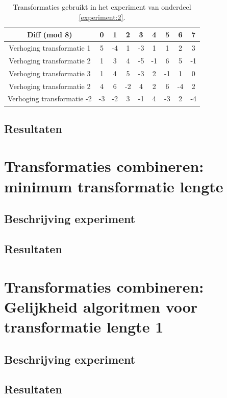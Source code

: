\begin{table}
  \centering
  \begin{tabular}{c | c c c c c c c c }
    Diff (mod 8) & 0 & 1 & 2 & 3 & 4 & 5 & 6 & 7 \\
    \hline
    \hline
    Verhoging transformatie 1 & 5 & -4 & 1 & -3 & 1 & 1 & 2 & 3 \\
    \hline
    Verhoging transformatie 2 & 1 & 3 & 4 & -5 & -1 & 6 & 5 & -1 \\
    \hline
    Verhoging transformatie 3 & 1 & 4 & 5 & -3 & 2 & -1 & 1 & 0 \\
    \hline
    Verhoging transformatie 2 & 4 & 6 & -2 & 4 & 2 & 6 & -4 & 2 \\
    \hline
    Verhoging transformatie -2 & -3 & -2 & 3 & -1 & 4 & -3 & 2 & -4 \\
  \end{tabular}
  \caption{Transformaties gebruikt in het experiment van onderdeel \ref{experiment:2}.}
  \label{tabel:exp2}
\end{table}

\subsection{Resultaten}

\section{Transformaties combineren: minimum transformatie lengte}
\label{experiment:3}
\subsection{Beschrijving experiment}

\subsection{Resultaten}

\section{Transformaties combineren: Gelijkheid algoritmen voor transformatie lengte 1}
\label{experiment:4}
\subsection{Beschrijving experiment}

\subsection{Resultaten}

